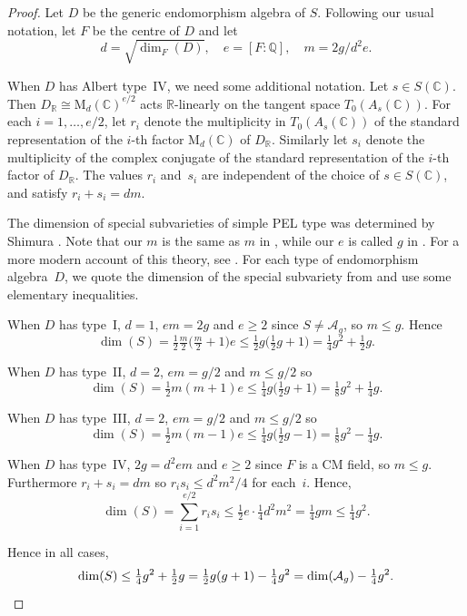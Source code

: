 \documentclass[11pt]{article}
\numberwithin{equation}{section}
\newcommand{\bC}{\mathbb{C}}
\newcommand{\bQ}{\mathbb{Q}}
\newcommand{\bR}{\mathbb{R}}
\newcommand{\Ag}{\mathcal{A}_g}
\newcommand{\rM}{\mathrm{M}}
\begin{document}
\begin{proof}
Let $D$ be the generic endomorphism algebra of $S$. Following our usual notation, let $F$ be the centre of $D$ and let
\[
d = \sqrt{\dim_F(D)}, \quad e = [F:\bQ], \quad m = 2g/d^2e.
\]

When $D$ has Albert type~IV, we need some additional notation.
Let $s \in S(\bC)$.
Then $D_\bR \cong \rM_d(\bC)^{e/2}$ acts $\bR$-linearly on the tangent space $T_0(A_s(\bC))$.
For each $i = 1, \dotsc, e/2$, let $r_i$ denote the multiplicity in $T_0(A_s(\bC))$ of the standard representation of the $i$-th factor $\rM_d(\bC)$ of $D_\bR$.
Similarly let $s_i$ denote the multiplicity of the complex conjugate of the standard representation of the $i$-th factor of $D_\bR$.
The values $r_i$ and~$s_i$ are independent of the choice of $s \in S(\bC)$, and satisfy $r_i + s_i = dm$.

The dimension of special subvarieties of simple PEL type was determined by Shimura \cite[4.1]{Shi63}.
Note that our $m$ is the same as $m$ in \cite{Shi63}, while our $e$ is called $g$ in \cite{Shi63}.
For a more modern account of this theory, see \cite[Chap.\,9]{BL04}.
For each type of endomorphism algebra~$D$, we quote the dimension of the special subvariety from \cite[4.1]{Shi63} and use some elementary inequalities.

When $D$ has type~I, $d=1$, $em = 2g$ and $e \geq 2$ since $S \neq \Ag$, so $m \leq g$.
Hence
\[
\dim(S) = \tfrac{1}{2} \tfrac{m}{2} \bigl( \tfrac{m}{2} + 1 \bigr)e
\leq \tfrac{1}{2} g \bigl( \tfrac{1}{2}g + 1 \bigr) = \tfrac{1}{4}g^2 + \tfrac{1}{2}g.
\]

When $D$ has type~II, $d=2$, $em = g/2$ and $m \leq g/2$ so
\[
\dim(S) = \tfrac{1}{2} m(m+1)e
\leq \tfrac{1}{4}g \bigl( \tfrac{1}{2}g + 1 \bigr) = \tfrac{1}{8}g^2 + \tfrac{1}{4}g.
\]

When $D$ has type~III, $d=2$, $em = g/2$ and $m \leq g/2$ so
\[
\dim(S) = \tfrac{1}{2} m(m-1)e
\leq \tfrac{1}{4}g \bigl( \tfrac{1}{2}g - 1 \bigr) = \tfrac{1}{8}g^2 - \tfrac{1}{4}g.
\]

When $D$ has type~IV, $2g = d^2em$ and $e \geq 2$ since $F$ is a CM field, so $m \leq g$.
Furthermore $r_i + s_i = dm$ so $r_is_i \leq d^2m^2/4$ for each~$i$.
Hence,
\[
\dim(S) = \sum_{i=1}^{e/2} r_i s_i \leq \tfrac{1}{2}e \cdot \tfrac{1}{4}d^2m^2 = \tfrac{1}{4}gm \leq \tfrac{1}{4}g^2.
\]

Hence in all cases,
\[
\dim(S) \leq \tfrac{1}{4}g^2 + \tfrac{1}{2}g = \tfrac{1}{2}g(g+1) - \tfrac{1}{4}g^2 = \dim(\Ag) - \tfrac{1}{4}g^2.
\qedhere
\]
\end{proof}
\end{document}
